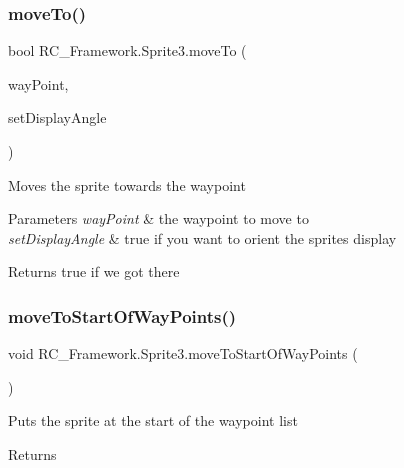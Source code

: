 \subsubsection{\texorpdfstring{move\+To()}{moveTo()}\hspace{0.1cm}{\footnotesize\ttfamily [2/2]}}
{\footnotesize\ttfamily bool R\+C\+\_\+\+Framework.\+Sprite3.\+move\+To (\begin{DoxyParamCaption}\item[{\mbox{\hyperlink{class_r_c___framework_1_1_way_point}{Way\+Point}}}]{way\+Point,  }\item[{bool}]{set\+Display\+Angle }\end{DoxyParamCaption})}



Moves the sprite towards the waypoint 


\begin{DoxyParams}{Parameters}
{\em way\+Point} & the waypoint to move to\\
\hline
{\em set\+Display\+Angle} & true if you want to orient the sprites display\\
\hline
\end{DoxyParams}
\begin{DoxyReturn}{Returns}
true if we got there
\end{DoxyReturn}
\mbox{\label{class_r_c___framework_1_1_sprite3_a0dc780cf6c8438ad43880143e9e273c1}} 
\subsubsection{\texorpdfstring{move\+To\+Start\+Of\+Way\+Points()}{moveToStartOfWayPoints()}}
{\footnotesize\ttfamily void R\+C\+\_\+\+Framework.\+Sprite3.\+move\+To\+Start\+Of\+Way\+Points (\begin{DoxyParamCaption}{ }\end{DoxyParamCaption})}



Puts the sprite at the start of the waypoint list 

\begin{DoxyReturn}{Returns}

\end{DoxyReturn}
\mbox{\label{class_r_c___framework_1_1_sprite3_a7f4a44725a3873c534b0466b7b49a990}} 
